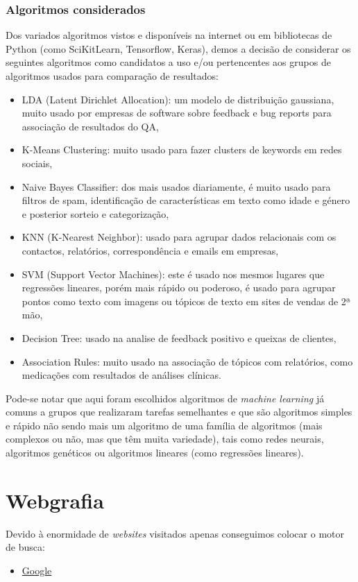 \documentclass[a4paper,10pt]{article}
\begin{document}
\subsubsection{Algoritmos considerados}

Dos variados algoritmos vistos e disponíveis na internet ou em bibliotecas de Python (como SciKitLearn, Tensorflow, Keras), demos a decisão de considerar os seguintes algoritmos como candidatos a uso e/ou pertencentes aos grupos de algoritmos usados para comparação de resultados:
\begin{itemize}
    \item LDA (Latent Dirichlet Allocation): um modelo de distribuição gaussiana, muito usado por empresas de software sobre feedback e bug reports para associação de resultados do QA,
    \item K-Means Clustering: muito usado para fazer clusters de keywords em redes sociais,
    \item Naive Bayes Classifier: dos mais usados diariamente, é muito usado para filtros de spam, identificação de características em texto como idade e género e posterior sorteio e categorização,
    \item KNN (K-Nearest Neighbor): usado para agrupar dados relacionais com os contactos, relatórios, correspondência e emails em empresas,
    \item SVM (Support Vector Machines): este é usado nos mesmos lugares que regressões lineares, porém mais rápido ou poderoso, é usado para agrupar pontos como texto com imagens ou tópicos de texto em sites de vendas de 2ª mão,
    \item Decision Tree: usado na analise de feedback positivo e queixas de clientes,
    \item Association Rules: muito usado na associação de tópicos com relatórios, como medicações com resultados de análises clínicas.
\end{itemize}

Pode-se notar que aqui foram escolhidos algoritmos de \textit{machine learning} já comuns a grupos que realizaram tarefas semelhantes e que são algoritmos simples e rápido não sendo mais um algoritmo de uma família de algoritmos (mais complexos ou não, mas que têm muita variedade), tais como redes neurais, algoritmos genéticos ou algoritmos lineares (como regressões lineares).

\section{Webgrafia}

Devido à enormidade de \textit{websites} visitados apenas conseguimos colocar o motor de busca:
\begin{itemize}
    \item \href{https://www.google.com/}{Google}
\end{itemize}
\end{document}
